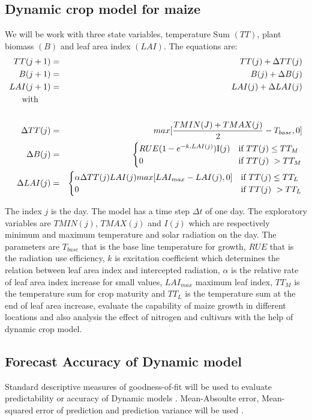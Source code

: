 \subsection{Dynamic crop model for maize }
We will be work with three state variables, temperature Sum $(TT)$, plant biomass $(B)$ and leaf area index $(LAI)$.  The equations are:
\begin{eqnarray}
TT(j+1)&=& TT(j)+\Delta TT(j) \\
B(j+1)&=& B(j)+ \Delta B(j)  \\
LAI(j+1)&=& LAI(j)+ \Delta LAI(j)\\
\noalign{with} \nonumber \\ 
\Delta TT(j)&=& max[\frac{T MIN (J)+T MAX(j)}{2}-T_{base}, 0] \\
\Delta B(j) &=&
\begin{cases}
RUE (1-e^{-k. LAI(j)})\text{I}(j) & \text{if }  TT(j)\leq TT_M  \\         
0  & \text{if }  TT(j)\ > TT_M  \\
\end{cases}\\
\Delta LAI(j) &=&
\begin{cases}
\alpha \Delta TT(j)LAI(j) max[LAI_{max}-LAI(j),0] & \text{if }  TT(j)\leq TT_L  \\
 0  & \text{if }  TT(j)\ > TT_L \\
\end{cases}
\end{eqnarray}
   
  
 The index $j$ is the day. The model has a time step $\Delta t$ of one day. The exploratory variables are $TMIN(j)$, $TMAX(j)$ and  $I(j)$ which are respectively minimum and maximum temperature and solar radiation on the day. The parameters are $T_{base}$ that is the base line temperature for growth,  $RUE$  that is the radiation use efficiency, $k$ is excitation coefficient which determines the relation between leaf area index and intercepted radiation, $\alpha$ is the relative rate of leaf area index increase for small values, $LAI_{max}$ maximum leaf index,  $TT_M$ is the temperature sum for crop maturity and  $TT_L$ is the temperature sum at the end of leaf area increase, evaluate the capability of maize growth in different locations and also analysis the effect of nitrogen and cultivars  with the help of dynamic crop model.
 \subsection{Forecast Accuracy of Dynamic model } 
 Standard descriptive measures of goodness-of-fit will be used to evaluate predictability or accuracy  of Dynamic models \citep{HansenIndeje2004}. Mean-Absoulte error, Mean-squared error of prediction and prediction variance will be used . 


